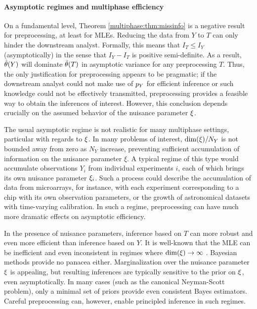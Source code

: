 \paragraph{Asymptotic regimes and multiphase efficiency}
On a fundamental level, Theorem \ref{multiphase:thm:missinfo} is a negative result for preprocessing, at least for MLEs.
Reducing the data from $Y$ to $T$ can only hinder the downstream analyst.
Formally, this means that $I_T \leq I_Y$ (asymptotically) in the sense that $I_Y - I_T$ is positive semi-definite.
As a result, $\hat{\theta}(Y)$ will dominate $\hat{\theta}(T)$ in asymptotic variance for any preprocessing $T$.
Thus, the only justification for preprocessing appears to be pragmatic; if the downstream analyst could not make use of $p_Y$ for efficient inference or such knowledge could not be effectively transmitted, preprocessing provides a feasible way to obtain the inferences of interest.
However, this conclusion depends crucially on the assumed behavior of the nuisance parameter $\xi$.

The usual asymptotic regime is not realistic for many multiphase settings, particular with regards to $\xi$.
In many problems of interest, $\dim(\xi) / N_Y $ is not bounded away from zero as $N_Y$ increase, preventing sufficient accumulation of information on the nuisance parameter $\xi$.
A typical regime of this type would accumulate observations $Y_i$ from individual experiments $i$, each of which brings its own nuisance parameter $\xi_i$.
Such a process could describe the accumulation of data from microarrays, for instance, with each experiment corresponding to a chip with its own observation parameters, or the growth of astronomical datasets with time-varying calibration.
In such a regime, preprocessing can have much more dramatic effects on asymptotic efficiency.

In the presence of nuisance parameters, inference based on $T$ can more robust and even more efficient than inference based on $Y$.
It is well-known that the MLE can be inefficient and even inconsistent in regimes where $\dim(\xi) \rightarrow \infty$ \citep[going back to at least][]{NeymanScott1948}.
Bayesian methods provide no panacea either.
Marginalization over the nuisance parameter $\xi$ is appealing, but resulting inferences are typically sensitive to the prior on $\xi$, even asymptotically.
In many cases (such as the canonical Neyman-Scott problem), only a minimal set of priors provide even consistent Bayes estimators.
Careful preprocessing can, however, enable principled inference in such regimes.

